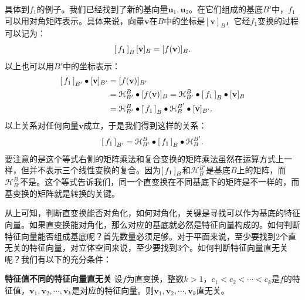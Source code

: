 \documentclass[12pt,UTF8]{ctexbook}
\begin{document}
具体到$f_1$的例子。我们已经找到了新的基向量$\mathbf{u}_1,\mathbf{u}_2$。在它们组成的基底$B'$中，$f_1$可以用对角矩阵表示。具体来说，向量$\mathbf{v}$在$B$中的坐标是$[\mathbf{v}]_B$，它经$f_1$变换的过程可以记为：
$$ 
\bmat{f_1}[B] [\mathbf{v}]_B = [f(\mathbf{v})]_B.
$$
以上也可以用$B'$中的坐标表示：
\begin{align*}
    \bmat{f_1}[B'] \bullet[\mathbf{v}]_{B'} &= [f(\mathbf{v})]_{B'} \\
    &= \mathcal{H}_{B'}^B\bullet [f(\mathbf{v})]_{B}  = \mathcal{H}_{B'}^B \bullet\bmat{f_1}[B] \bullet[\mathbf{v}]_B\\
    &= \mathcal{H}_{B'}^B \bullet \bmat{f_1}[B] \bullet\mathcal{H}_B^{B'}\bullet [\mathbf{v}]_{B'}.
\end{align*}
以上关系对任何向量$\mathbf{v}$成立，于是我们得到这样的关系：
$$
\bmat{f_1}[B'] = \mathcal{H}_{B'}^B\bullet\bmat{f_1}[B]\bullet\mathcal{H}_B^{B'}.
$$
要注意的是这个等式右侧的矩阵乘法和复合变换的矩阵乘法虽然在运算方式上一样，但并不表示三个线性变换的复合。因为$\bmat{f_1}[B]$和$\mathcal{H}_B^{B'}$是基底$B$上的矩阵，而$\mathcal{H}_{B'}^B$不是。这个等式告诉我们，同一个直变换在不同基底下的矩阵是不一样的，而基变换的矩阵就是转换的关键。

从上可知，判断直变换能否对角化，如何对角化，关键是寻找可以作为基底的特征向量。如果直变换能对角化，那么对应的基底就必然是特征向量构成的。如何判断特征向量能否组成基底呢？首先数量必须足够。对于平面来说，至少要找到$2$个直无关的特征向量，对立体空间来说，至少要找到$3$个。如何判断特征向量直无关呢？我们有以下的充分条件：
\begin{tm}{\textbf{特征值不同的特征向量直无关}}
    设$f$为直变换，整数$k>1$，$c_1<c_2<\cdots<c_k$是$f$的特征值，$\mathbf{v}_1,\mathbf{v}_2,\cdots,\mathbf{v}_k$是对应的特征向量。则$\mathbf{v}_1,\mathbf{v}_2,\cdots,\mathbf{v}_k$直无关。
\end{tm}
\end{document}

